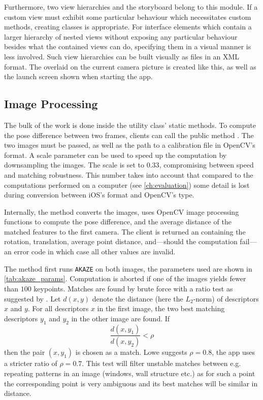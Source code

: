 Furthermore, two view hierarchies and the storyboard belong to this module.  If
a custom view must exhibit some particular behaviour which necessitates custom
methods, creating classes is appropriate. For interface elements which contain a
larger hierarchy of nested views without exposing any particular behaviour
besides what the contained views can do,
specifying them in a visual manner is less involved. Such view hierarchies can
be built visually as  files in an XML format. The
 overlaid on the current camera picture is created like
this, as well as the launch screen shown when starting the app.


\subsection{Image Processing}


The bulk of the work is done inside the utility class'  static
methods. To compute the pose difference between two frames, clients can call the
public method
.
The two images must be passed, as well as the path to a calibration file in
OpenCV's  format. A scale parameter can be used to speed up
the computation by downsampling the images.  The scale is set to $0.33$,
compromising between speed and matching robustness. This number takes into
account that compared to the computations performed on a computer (see
\autoref{ch:evaluation}) some detail is lost during conversion between iOS's
 format and OpenCV's  type.

Internally, the method converts the images, uses OpenCV image processing
functions to compute the pose difference, and the average distance of the matched
features to the first camera. The client is returned an 
containing the rotation, translation, average point distance, and---should the
computation fail---an error code in which case all other values are invalid.

The method first runs \texttt{AKAZE} on both images, the parameters used are
shown in \autoref{tab:akaze_params}.  Computation is aborted if one of the
images yields fewer than $100$ keypoints.  Matches are found by brute force with
a ratio test as suggested by \citet{lowe2004}. Let $d(x,y)$ denote the distance
(here the $L_2$-norm) of descriptors $x$ and $y$. For all descriptors $x$ in the
first image, the two best matching descriptors $y_1$ and $y_2$ in the other
image are found. If
\begin{equation*}
   \frac{d(x,y_1)}{d(x,y_2)} < \rho
\end{equation*}
then the pair $(x,y_1)$ is chosen as a match. Lowe suggests $\rho=0.8$, the app
uses a stricter ratio of $\rho=0.7$. This test will filter unstable matches
between e.g. repeating patterns in an image (windows, wall structure etc.) as
for such a point the corresponding point is very ambiguous and its best matches
will be similar in distance.

